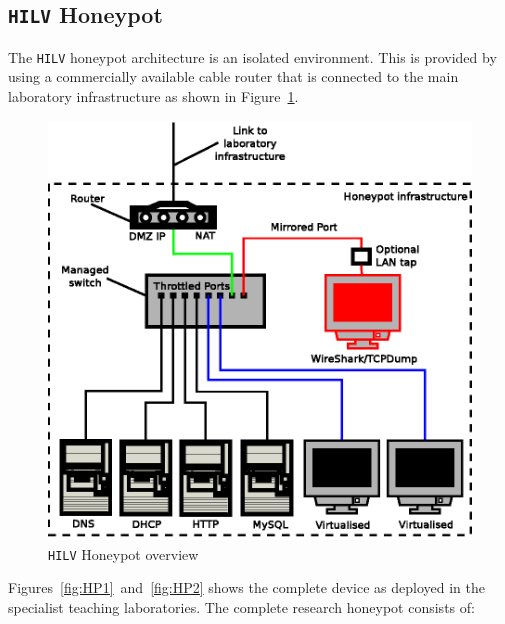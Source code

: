 \subsection{\texttt{HILV} Honeypot}
The \texttt{HILV} honeypot architecture is an isolated environment. This is provided by using a commercially available cable router that is connected to the main laboratory infrastructure as shown in Figure~\ref{fig:HPOverview}. 

\begin{figure}[!ht]
\begin{center}
	\includegraphics[scale=0.70]{Images/Honeypot1.eps}
\caption{\texttt{HILV} Honeypot overview}
\label{fig:HPOverview}
\end{center}
\end{figure}

Figures~\ref{fig:HP1}~and~\ref{fig:HP2} shows the complete device as deployed in the specialist teaching laboratories. The complete research honeypot consists of:

